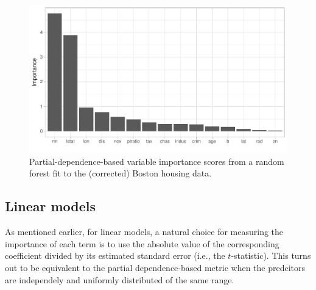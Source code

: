 \documentclass[12pt]{article}
\begin{document}
\begin{figure}[!htb]
  \label{boston-rf-vip-pd}
  \centering
  \includegraphics[width=1.0\textwidth]{boston-rf-vip-pd}
  \caption{Partial-dependence-based variable importance scores from a random forest fit to the (corrected) Boston housing data.}
\end{figure}


\subsection{Linear models}
\label{sec:linear}

As mentioned earlier, for linear models, a natural choice for measuring the importance of each term is to use the absolute value of the corresponding coefficient divided by its estimated standard error (i.e., the $t$-statistic). This turns out to be equivalent to the partial dependence-based metric when the predcitors are independely and uniformly distributed of the same range.
\end{document}
